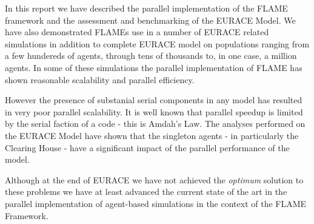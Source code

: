 In this report we have described the parallel implementation of the FLAME framework and the assessment and benchmarking of the EURACE Model. We have also demonstrated FLAMEs use in a number of EURACE related simulations in addition to complete EURACE model on populations ranging from a few hundereds of agents, through tens of thousands to, in one case, a million agents.  In some of these simulations the parallel implementation of FLAME has shown reasonable scalability and parallel efficiency.

However the presence of substanial serial components in any model has resulted in very poor parallel scalability. It is well known that parallel speedup is limited by the serial faction of a code - this is Amdah's Law. The analyses performed on the EURACE Model have shown that the singleton agents - in particularly the Clearing House - have a significant impact of the parallel performance of the model.

Although at the end of EURACE we have not achieved the \textsl{optimum} solution to these problems we have at least advanced the current state of the art in the parallel implementation of agent-based simulations in the context of the FLAME Framework.
